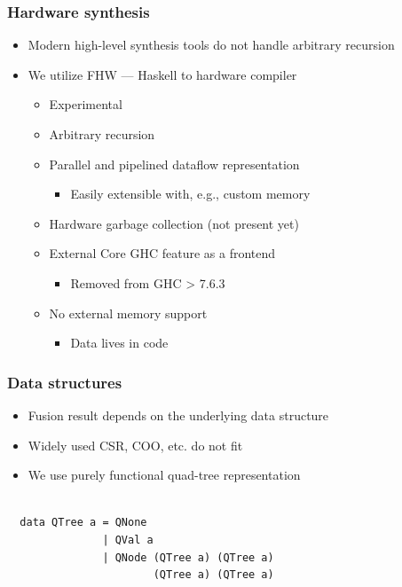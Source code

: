 \documentclass[xcolor=table]{beamer}
\begin{document}
\begin{frame}[fragile] \frametitle{Hardware synthesis}

    \begin{itemize}
        \item Modern high-level synthesis tools do not handle arbitrary recursion
        \vfill
        \item We utilize FHW --- Haskell to hardware compiler
        \vfill
        \begin{itemize}
            \item Experimental
            \vfill
            \item Arbitrary recursion
            \vfill
            \item Parallel and pipelined dataflow representation
            \vfill
            \begin{itemize}
                \item Easily extensible with, e.g., custom memory
            \end{itemize}
            \vfill
            \item Hardware garbage collection (not present yet)
            \vfill
            \item External Core GHC feature as a frontend
            \begin{itemize}
                \item Removed from GHC > 7.6.3
            \end{itemize}
            \vfill
            \item No external memory support
            \vfill
            \begin{itemize}
                \item Data lives in code 
            \end{itemize}
        \end{itemize}
    \end{itemize}
      
\end{frame}


\begin{frame}[fragile] \frametitle{Data structures}

    \begin{itemize}
        \item Fusion result depends on the underlying data structure
        \vfill
        \item Widely used CSR, COO, etc. do not fit
        \vfill
        \item We use purely functional quad-tree representation
    \end{itemize}
    
\vspace{1cm}

\begin{verbatim}

  data QTree a = QNone  
               | QVal a 
               | QNode (QTree a) (QTree a)
                       (QTree a) (QTree a) 
  
 \end{verbatim}

\end{frame}
\end{document}

